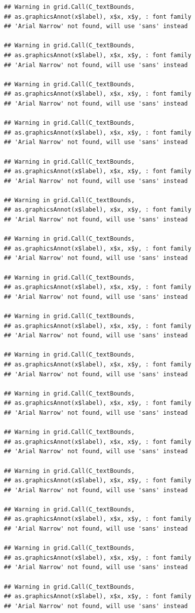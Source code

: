 \documentclass[]{krantz}
\begin{document}
\begin{verbatim}
## Warning in grid.Call(C_textBounds,
## as.graphicsAnnot(x$label), x$x, x$y, : font family
## 'Arial Narrow' not found, will use 'sans' instead

## Warning in grid.Call(C_textBounds,
## as.graphicsAnnot(x$label), x$x, x$y, : font family
## 'Arial Narrow' not found, will use 'sans' instead

## Warning in grid.Call(C_textBounds,
## as.graphicsAnnot(x$label), x$x, x$y, : font family
## 'Arial Narrow' not found, will use 'sans' instead

## Warning in grid.Call(C_textBounds,
## as.graphicsAnnot(x$label), x$x, x$y, : font family
## 'Arial Narrow' not found, will use 'sans' instead

## Warning in grid.Call(C_textBounds,
## as.graphicsAnnot(x$label), x$x, x$y, : font family
## 'Arial Narrow' not found, will use 'sans' instead

## Warning in grid.Call(C_textBounds,
## as.graphicsAnnot(x$label), x$x, x$y, : font family
## 'Arial Narrow' not found, will use 'sans' instead

## Warning in grid.Call(C_textBounds,
## as.graphicsAnnot(x$label), x$x, x$y, : font family
## 'Arial Narrow' not found, will use 'sans' instead

## Warning in grid.Call(C_textBounds,
## as.graphicsAnnot(x$label), x$x, x$y, : font family
## 'Arial Narrow' not found, will use 'sans' instead

## Warning in grid.Call(C_textBounds,
## as.graphicsAnnot(x$label), x$x, x$y, : font family
## 'Arial Narrow' not found, will use 'sans' instead

## Warning in grid.Call(C_textBounds,
## as.graphicsAnnot(x$label), x$x, x$y, : font family
## 'Arial Narrow' not found, will use 'sans' instead

## Warning in grid.Call(C_textBounds,
## as.graphicsAnnot(x$label), x$x, x$y, : font family
## 'Arial Narrow' not found, will use 'sans' instead

## Warning in grid.Call(C_textBounds,
## as.graphicsAnnot(x$label), x$x, x$y, : font family
## 'Arial Narrow' not found, will use 'sans' instead

## Warning in grid.Call(C_textBounds,
## as.graphicsAnnot(x$label), x$x, x$y, : font family
## 'Arial Narrow' not found, will use 'sans' instead

## Warning in grid.Call(C_textBounds,
## as.graphicsAnnot(x$label), x$x, x$y, : font family
## 'Arial Narrow' not found, will use 'sans' instead

## Warning in grid.Call(C_textBounds,
## as.graphicsAnnot(x$label), x$x, x$y, : font family
## 'Arial Narrow' not found, will use 'sans' instead

## Warning in grid.Call(C_textBounds,
## as.graphicsAnnot(x$label), x$x, x$y, : font family
## 'Arial Narrow' not found, will use 'sans' instead
\end{verbatim}
\end{document}
